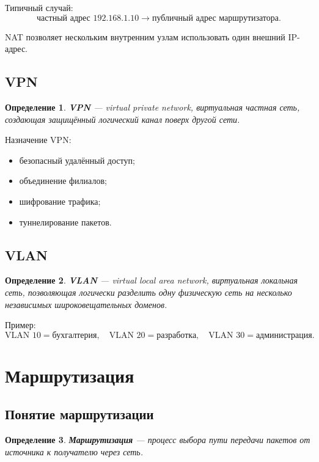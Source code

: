 \documentclass[12pt,a4paper]{article}
\newtheorem{definition}{Определение}
\begin{document}
Типичный случай:
\[
\text{частный адрес } 192.168.1.10
\rightarrow
\text{публичный адрес маршрутизатора}.
\]

NAT позволяет нескольким внутренним узлам использовать один внешний IP-адрес.

\subsection{VPN}

\begin{definition}
\textbf{VPN} --- virtual private network, виртуальная частная сеть, создающая защищённый логический канал поверх другой сети.
\end{definition}

Назначение VPN:
\begin{itemize}
    \item безопасный удалённый доступ;
    \item объединение филиалов;
    \item шифрование трафика;
    \item туннелирование пакетов.
\end{itemize}

\subsection{VLAN}

\begin{definition}
\textbf{VLAN} --- virtual local area network, виртуальная локальная сеть, позволяющая логически разделить одну физическую сеть на несколько независимых широковещательных доменов.
\end{definition}

Пример:
\[
\text{VLAN 10} = \text{бухгалтерия},\quad
\text{VLAN 20} = \text{разработка},\quad
\text{VLAN 30} = \text{администрация}.
\]

\section{Маршрутизация}

\subsection{Понятие маршрутизации}

\begin{definition}
\textbf{Маршрутизация} --- процесс выбора пути передачи пакетов от источника к получателю через сеть.
\end{definition}
\end{document}
